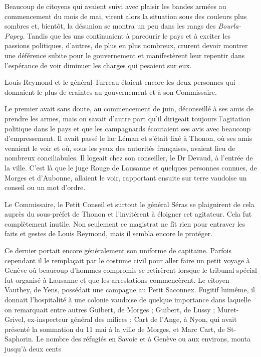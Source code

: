 \documentclass[french,twoside]{book} %
\begin{document}
Beaucoup de citoyens qui avaient suivi avec plaisir les bandes armées au commencement du mois de mai, virent alors la situation sous des couleurs plus sombres et, bientôt, la désunion se montra un peu dans les rangs des \emph{Bourla-Papey.} Tandis que les uns continuaient à parcourir le pays et à exciter les passions politiques, d’autres, de plus en plus nombreux, crurent devoir montrer une déférence subite pour le gouvernement et manifestèrent leur repentir dans l’espérance de voir diminuer les charges qui pesaient sur eux.\par
Louis Reymond et le général Turreau étaient encore les deux personnes qui donnaient le plus de craintes au gouvernement et à son Commissaire.\par
Le premier avait sans doute, au commencement de juin, déconseillé à ses amis de prendre les armes, mais on savait d’autre part qu’il dirigeait toujours l’agitation politique dans le pays et que les campagnards écoutaient ses avis avec beaucoup d’empressement. Il avait passé le lac Léman et s’était fixé à Thonon, où ses amis venaient le voir et où, sous les yeux des autorités françaises, avaient lieu de nombreux conciliabules. Il logeait chez son conseiller, le Dr Devaud, à l’entrée de la ville. C’est là que le juge Rouge de Lausanne et quelques personnes connues, de Morges et d’Aubonne, allaient le voir, rapportant ensuite sur terre vaudoise un conseil ou un mot d’ordre.\par
Le Commissaire, le Petit Conseil et surtout le général Séras se plaignirent de cela auprès du sous-préfet de Thonon et l’invitèrent à éloigner cet agitateur. Cela fut complètement inutile. Non seulement ce magistrat ne fît rien pour entraver les faits et gestes de Louis Reymond, mais il sembla encore le protéger.\par
Ce dernier portait encore généralement son uniforme de capitaine. Parfois cependant il le remplaçait par le costume civil pour aller faire un petit voyage à Genève où beaucoup d’hommes compromis se retirèrent lorsque le tribunal spécial fut organisé à Lausanne et que les arrestations commencèrent. Le citoyen Vauthey, de Yens, possédait une campagne au Petit Saconnex. Fugitif luimême, il donnait l’hospitalité à une colonie vaudoise de quelque importance dans laquelle on remarquait entre autres Guibert, de Morges ; Guibert, de Lussy ; Muret-Grivel, ex-inspecteur général des milices ; Cart de l’Ange, à Nyon, qui avait présenté la sommation du 11 mai à la ville de Morges, et Marc Cart, de St-Saphorin. Le nombre des réfugiés en Savoie et à Genève ou aux environs, monta jusqu’à deux cents\par
\end{document}
